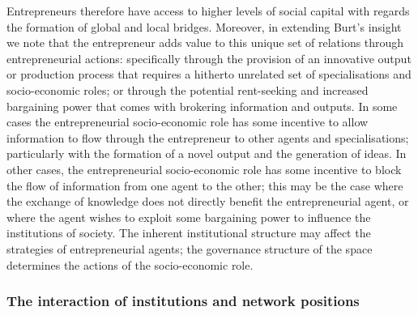 Entrepreneurs therefore have access to higher levels of social capital with regards the formation of global and local bridges. Moreover, in extending Burt's insight we note that the entrepreneur adds value to this unique set of relations through entrepreneurial actions: specifically through the provision of an innovative output or production process that requires a hitherto unrelated set of specialisations and socio-economic roles; or through the potential rent-seeking and increased bargaining power that comes with brokering information and outputs. In some cases the entrepreneurial socio-economic role has some incentive to allow information to flow through the entrepreneur to other agents and specialisations; particularly with the formation of a novel output and the generation of ideas. In other cases, the entrepreneurial socio-economic role has some incentive to block the flow of information from one agent to the other; this may be the case where the exchange of knowledge does not directly benefit the entrepreneurial agent, or where the agent wishes to exploit some bargaining power to influence the institutions of society. The inherent institutional structure may affect the strategies of entrepreneurial agents; the governance structure of the space determines the actions of the socio-economic role.

\subsubsection{The interaction of institutions and network positions}

